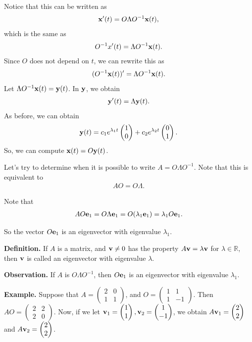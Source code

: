 \documentclass{article}
\newcommand{\RR}{\mathbb{R}}
\newcommand{\mat}[1]{\begin{pmatrix}#1\end{pmatrix}}
\begin{document}
\begin{itemize}
    Notice that this can be written as
    \begin{align*}
      \mathbf{x}'(t) = O \Lambda O^{-1} \mathbf{x}(t),
    \end{align*}
    which is the same as
    \begin{align*}
      O^{-1} x'(t) = \Lambda O^{-1} \mathbf{x}(t).
    \end{align*}
    Since $O$ does not depend on $t$, we can rewrite this as
    \begin{align*}
      (O^{-1} \mathbf{x}(t))' = \Lambda O^{-1} \mathbf{x}(t).
    \end{align*}
    Let $\Lambda O^{-1} \mathbf{x}(t) = \mathbf{y}(t)$.  In $\mathbf{y}$, we obtain
    \begin{align*}
      \mathbf{y}'(t) = \Lambda \mathbf{y}(t).
    \end{align*}
    As before, we can obtain
    \begin{align*}
      \mbf{y}(t) = c_1 e^{\lambda_1 t} \mat{1 \\ 0} + c_2 e^{\lambda_2 t} \mat{0 \\ 1}.
    \end{align*}
    So, we can compute $\mathbf{x}(t) = O \mathbf{y}(t)$.
\end{itemize}

Let's try to determine when it is possible to write $A = O \Lambda O^{-1}$.  Note that this is equivalent to
\begin{align*}
  AO = O \Lambda.
\end{align*}

Note that
\begin{align*}
  A O \mathbf{e}_1 = O \Lambda \mathbf{e}_1 = O(\lambda_1 \mathbf{e}_1) = \lambda_1 O \mathbf{e}_1.
\end{align*}

So the vector $O \mathbf{e}_1$ is an eigenvector with eigenvalue $\lambda_1$.

{\bf Definition.} If $A$ is a matrix, and $\mathbf{v} \neq 0$ has the property $A \mathbf{v} = \lambda \mathbf{v}$ for $\lambda \in \RR$, then $\mathbf{v}$ is called an eigenvector with eigenvalue $\lambda$.

{\bf Observation.} If $A$ is $O \Lambda O^{-1}$, then $O \mathbf{e}_1$ is an eigenvector with eigenvalue $\lambda_1$.

{\bf Example.} Suppose that $A = \mat{2 & 0 \\ 1 & 1}$, and $O = \mat{1 & 1 \\ 1 & -1}$.  Then $AO = \mat{2 & 2 \\ 2 & 0}$.  Now, if we let $\mbf{v}_1 = \mat{1 \\ 1}, \mbf{v}_2 = \mat{1 \\ -1}$, we obtain $A \mbf{v}_1 = \mat{2 \\ 2}$ and $A \mbf{v}_2 = \mat{2 \\ 2}$.
\end{document}
